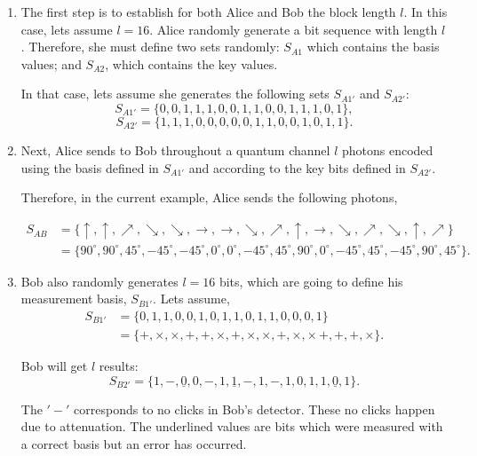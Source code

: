 \begin{enumerate}
  \item The first step is to establish for both Alice and Bob the block length $l$. In this case, lets assume $l=16$. Alice randomly generate a bit sequence with length $l$.
      Therefore, she must define two sets randomly: $S_{A1}$ which contains the basis values; and $S_{A2}$, which contains the key values.

      In that case, lets assume she generates the following sets $S_{A1'}$ and $S_{A2'}$:
      $$S_{A1'} = \{0,0,1,1,1,0,0,1,1,0,0,1,1,1,0,1 \},$$
      $$S_{A2'} = \{1,1,1,0,0,0,0,0,1,1,0,0,1,0,1,1 \}.$$

  \item Next, Alice sends to Bob throughout a quantum channel $l$ photons encoded using the basis defined in $S_{A1'}$ and according to the key bits defined in $S_{A2'}$.

      Therefore, in the current example, Alice sends the following photons,

      \begin{align*}
        S_{AB} & = \{\uparrow,\uparrow, \nearrow, \searrow, \searrow, \to, \to, \searrow, \nearrow,\uparrow, \to, \searrow,\nearrow,\searrow,\uparrow,\nearrow \} \\
          & =\{90^{\circ},90^{\circ}, 45^{\circ}, -45^{\circ},-45^{\circ}, 0^{\circ}, 0^{\circ}, -45^{\circ}, 45^{\circ},90^{\circ}, 0^{\circ}, -45^{\circ}, 45^{\circ}, -45^{\circ}, 90^{\circ}, 45^{\circ} \}.
        \label{eq:photonsalice}
      \end{align*}


  \item Bob also randomly generates $l=16$ bits, which are going to define his measurement basis, $S_{B1'}$. Lets assume,
        \begin{align*}
             S_{B1'} & = \{0,1,1,0,0,1,0,1,1,0,1,1,0,0,0,1 \} \\
                    & = \{ +,\times,\times,+,+,\times,+,\times, \times,+, \times, \times \,+,+,+,\times \}.
        \end{align*}

      Bob will get $l$ results:
      $$S_{B2'} = \{1,-,\underline{0},0,-,1,\underline{1},-,1,-,1,0,1,1,\underline{0},1 \}.$$

      The $'-'$ corresponds to no clicks in Bob's detector. These no clicks happen due to attenuation. The underlined values are bits which were measured with a correct basis but an error has occurred.


\end{enumerate}
